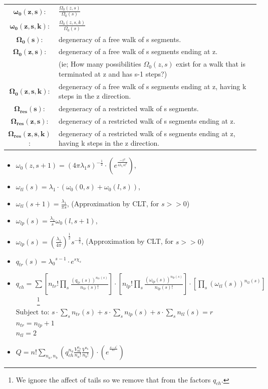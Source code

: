 \documentclass[10pt,letterpaper]{article}
\begin{document}
\begin{tabular}{c|l}
$\mathbf{\omega_{0}(z,s)}$:& $\frac{\Omega_0(z,s)}{\Omega_0(s)}$\\
$\mathbf{\omega_{0}(z,s,k)}$:& $\frac{\Omega_0(z,s,k)}{\Omega_0(s)}$\\
$\mathbf{\Omega_{0}(s)}$:& degeneracy of a free walk of s segments.\\
$\mathbf{\Omega_{0}(z,s)}$:&degeneracy of a free walk of s segments ending at z.\\
&(ie; How many possibilities $\Omega_{0}(z,s)$ exist for a walk that is terminated at z and has s-1 steps?)\\
$\mathbf{\Omega_{0}(z,s,k)}$: & degeneracy of a free walk of s segments ending at z, having k steps in the z direction.\\
$\mathbf{\Omega_{res}(s)}$:&degeneracy of a restricted walk of s segments.\\
$\mathbf{\Omega_{res}(z,s)}$:&degeneracy of a restricted walk of s segments ending at z.\\
$\mathbf{\Omega_{res}(z,s,k)}$:&degeneracy of a restricted walk of s segments ending at z, having k steps in the z direction.\\
\hline
\end{tabular} 
		
		
		
		\begin{itemize}
			\item $\omega_0(z,s+1)=(4\pi\lambda_1s)^{-\frac{1}{2}} \cdot(e^{\frac{-z^2}{4\lambda_1 s l^2}})$,
			\item $\omega_{tl}(s)=\lambda_1 \cdot(\omega_0(0,s)+\omega_0(l,s))$,
			\item $\omega_{tl}(s+1)=\frac{\lambda_1}{\pi s}$,  (Approximation by CLT, for $s>>0$) 
			\item $\omega_{lp}(s)=\frac{\lambda_1}{s}\omega_0(l,s+1)$,  
			\item $\omega_{lp}(s)=\left(\frac{\lambda_1}{4\pi}\right)^{\frac{1}{2}}s^{-\frac{3}{2}}$, (Approximation by CLT, for $s>>0$) 
			\item $q_{tr}(s)={\lambda_0}^{s-1}\cdot e^{s\chi_s}$
			\item$\displaystyle q_{ch}=\sum \left[n_{tr}!\prod_{s}\frac{\left(q_{tr}(s)\right)^{n_{tr}(s)}}{n_{tr}(s)!}\right]\cdot\left[n_{lp}!\prod_{s}\frac{\left(\omega_{lp}(s)\right)^{n_{lp}(s)}}{n_{lp}(s)!}\right]\cdot\left[\prod_{s}\left(\omega_{tl}(s)\right)^{n_{tl}(s)}\right]$~~~~~~\footnote{We ignore the affect of tails so we remove that from the factors $q_{ch}$.}\\
			 $\displaystyle\text{Subject to:  } s\cdot \sum_{s} n_{tr}(s)+s\cdot \sum_{s} n_{lp}(s)+s \cdot \sum_{s} n_{tl}(s)=r$\\
			 $n_{tr}=n_{lp}+1$\\
			 $n_{tl}=2$
			\item $\displaystyle Q=n!\sum_{n_a,n_b}\left(q_{ch}^{n_{a}}\frac{V_{m}^{n_{a}}}{n_a!}\frac{V^{n_{b}}}{n_b!}\right)\cdot \left(e^{^{\frac{A-A^{*}}{kT}}}\right)$
		\end{itemize}
\end{document}

